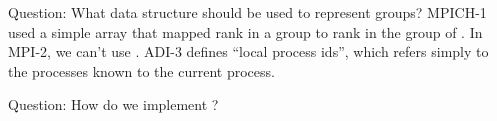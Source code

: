 \documentclass{article}
\begin{document}
Question: What data structure should be used to represent groups?
MPICH-1 used a simple array that mapped rank in a group to rank in the
group of .  In MPI-2, we can't use
.  ADI-3 defines ``local process ids'', which
refers simply to the processes known to the current process.

Question: How do we implement ?

\subsubsection{}
\subsubsection{}
\subsubsection{}
\subsubsection{}
\subsubsection{}
\subsubsection{}
\subsubsection{}
\subsubsection{}
\subsubsection{}
\subsubsection{}
\subsubsection{}
\end{document}
